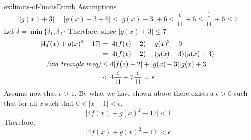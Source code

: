 \documentclass[landscape, 8pt]{extarticle}
\begin{document}
\begin{multicols}{3}
\begin{xmp}{ex:limits-of-limits}{Dumb Assumptions}
\[\lvert g(x) + 3\rvert = \lvert g(x) - 3 + 6\rvert \le \lvert g(x) - 3\rvert + 6 \le \frac{\epsilon}{11} + 6 \le \frac{1}{11} + 6 \le 7\]
Let $\delta = \min\{\delta_{1}, \delta_{2}\}$ Therefore, since $\lvert g(x) + 3\rvert  \le 7,$
\[\begin{aligned}
    \lvert 4f(x)+g(x)^{2} - 17 \rvert &= \lvert 4(f(x)-2) + g(x)^{2}-9\rvert \\
    &= \lvert 4(f(x)-2) + (g(x)-3)(g(x)+3)\rvert \\
    \text{\textit{(via triangle ineq)}} &\le 4\lvert f(x)-2\rvert + \lvert g(x)-3\rvert \lvert g(x)+3\rvert \\
    &< 4\frac{\epsilon}{11} + 7 \frac{\epsilon}{11}
    = \epsilon
\end{aligned}\]
Assume now that $\epsilon > 1$. By what we have shown above there exists a $\epsilon>0$ such that for all $x$ such that $0<\lvert x-1\rvert <\epsilon$,
\[\lvert 4f(x) + g(x)^{2} - 17  \rvert < 1\]
Therefore,
\[\lvert 4f(x) + g(x)^{2} - 17  \rvert < \epsilon\]
\end{xmp}
\vspace{-5pt}






\end{multicols}
\end{document}
